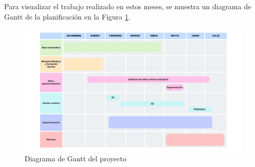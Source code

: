 Para visualizar el trabajo realizado en estos meses, se muestra un diagrama de Gantt de la planificación en la Figura \ref{fig:gantt_chart}.

\begin{figure}[!htbp]
    \centering
    \includegraphics[width=1.1\textwidth]{img/gantt.pdf}
    \caption{Diagrama de Gantt del proyecto}
    \label{fig:gantt_chart}
\end{figure}

\endinput
